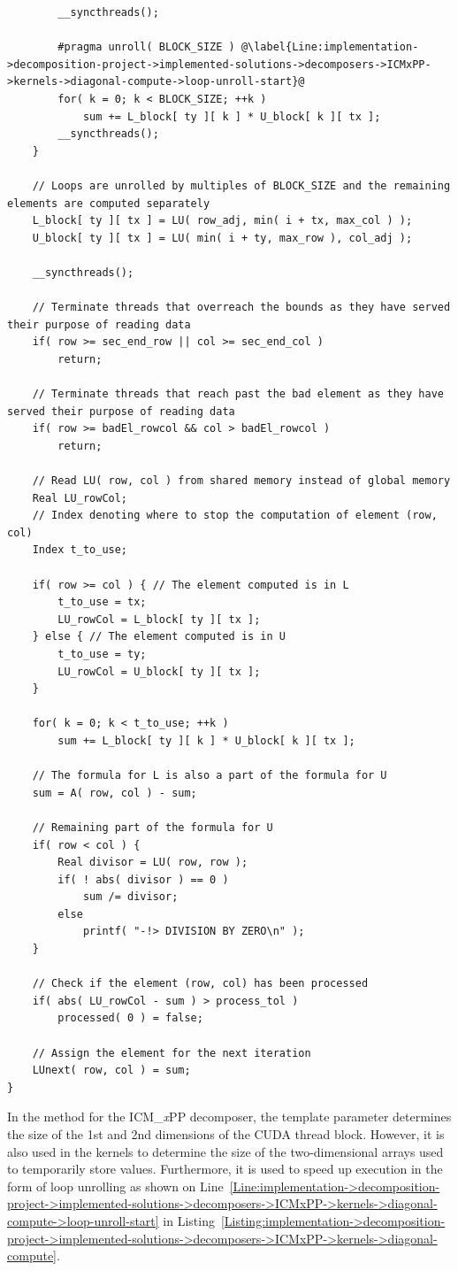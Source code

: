 \begin{lstlisting}
		__syncthreads();
		
		#pragma unroll( BLOCK_SIZE ) @\label{Line:implementation->decomposition-project->implemented-solutions->decomposers->ICMxPP->kernels->diagonal-compute->loop-unroll-start}@
		for( k = 0; k < BLOCK_SIZE; ++k )
			sum += L_block[ ty ][ k ] * U_block[ k ][ tx ];
		__syncthreads();
	}
	
	// Loops are unrolled by multiples of BLOCK_SIZE and the remaining elements are computed separately
	L_block[ ty ][ tx ] = LU( row_adj, min( i + tx, max_col ) );
	U_block[ ty ][ tx ] = LU( min( i + ty, max_row ), col_adj );
	
	__syncthreads();
	
	// Terminate threads that overreach the bounds as they have served their purpose of reading data
	if( row >= sec_end_row || col >= sec_end_col )
		return;
	
	// Terminate threads that reach past the bad element as they have served their purpose of reading data
	if( row >= badEl_rowcol && col > badEl_rowcol )
		return;
	
	// Read LU( row, col ) from shared memory instead of global memory
	Real LU_rowCol;
	// Index denoting where to stop the computation of element (row, col)
	Index t_to_use;
	
	if( row >= col ) { // The element computed is in L
		t_to_use = tx;
		LU_rowCol = L_block[ ty ][ tx ];
	} else { // The element computed is in U
		t_to_use = ty;
		LU_rowCol = U_block[ ty ][ tx ];
	}
	
	for( k = 0; k < t_to_use; ++k )
		sum += L_block[ ty ][ k ] * U_block[ k ][ tx ];
	
	// The formula for L is also a part of the formula for U
	sum = A( row, col ) - sum;
	
	// Remaining part of the formula for U
	if( row < col ) {
		Real divisor = LU( row, row );
		if( ! abs( divisor ) == 0 )
			sum /= divisor;
		else
			printf( "-!> DIVISION BY ZERO\n" );
	}
	
	// Check if the element (row, col) has been processed
	if( abs( LU_rowCol - sum ) > process_tol )
		processed( 0 ) = false;
	
	// Assign the element for the next iteration
	LUnext( row, col ) = sum;
}
\end{lstlisting}

In the  method for the ICM\_\textit{x}PP decomposer, the  template parameter determines the size of the 1st and 2nd dimensions of the CUDA thread block. However, it is also used in the kernels to determine the size of the two-dimensional arrays used to temporarily store values. Furthermore, it is used to speed up execution in the form of loop unrolling as shown on Line~\ref{Line:implementation->decomposition-project->implemented-solutions->decomposers->ICMxPP->kernels->diagonal-compute->loop-unroll-start} in Listing~\ref{Listing:implementation->decomposition-project->implemented-solutions->decomposers->ICMxPP->kernels->diagonal-compute}.

